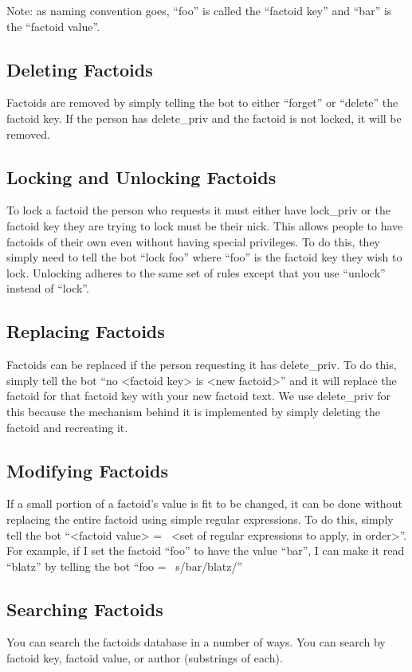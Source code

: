 \documentclass[titlepage]{article}
\begin{document}
			Note: as naming convention goes, ``foo'' is called the ``factoid
			key'' and ``bar'' is the ``factoid value''.

		\subsection{Deleting Factoids}
			Factoids are removed by simply telling the bot to either ``forget''
			or ``delete'' the factoid key.  If the person has delete\_priv and
			the factoid is not locked, it will be removed.

		\subsection{Locking and Unlocking Factoids}
			To lock a factoid the person who requests it must either have
			lock\_priv or the factoid key they are trying to lock must be
			their nick.  This allows people to have factoids of their own even
			without having special privileges.  To do this, they simply need
			to tell the bot ``lock foo'' where ``foo'' is the factoid key they
			wish to lock.  Unlocking adheres to the same set of rules except
			that you use ``unlock'' instead of ``lock''.

		\subsection{Replacing Factoids}
			Factoids can be replaced if the person requesting it has
			delete\_priv.  To do this, simply tell the bot ``no <factoid key>
			is <new factoid>'' and it will replace the factoid for that
			factoid key with your new factoid text.  We use delete\_priv for
			this because the mechanism behind it is implemented by simply
			deleting the factoid and recreating it.

		\subsection{Modifying Factoids}
			If a small portion of a factoid's value is fit to be changed, it
			can be done without replacing the entire factoid using simple
			regular expressions.  To do this, simply tell the bot ``<factoid
			value> =~ <set of regular expressions to apply, in order>''.  For
			example, if I set the factoid ``foo'' to have the value ``bar'', I
			can make it read ``blatz'' by telling the bot ``foo =~
			s/bar/blatz/''

		\subsection{Searching Factoids}
			You can search the factoids database in a number of ways.  You can
			search by factoid key, factoid value, or author (substrings of
			each).
			
\end{document}
